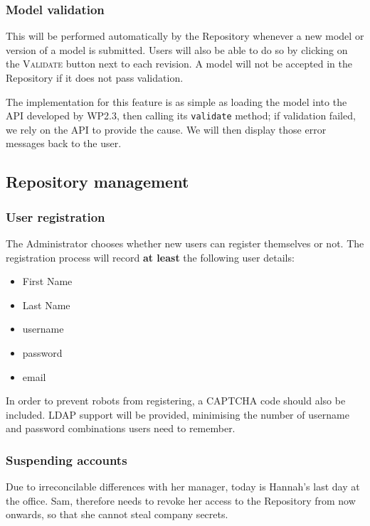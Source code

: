 \subsubsection{Model validation}
This will be performed automatically by the Repository whenever a new model or version of a model is submitted. Users will also be able to do so by clicking on the \textsc{Validate} button next to each revision. A model will not be accepted in the Repository if it does not pass validation. 

\begin{techNote}
The implementation for this feature is as simple as loading the model into the API developed by WP2.3, then calling its \texttt{validate} method; if validation failed, we rely on the API to provide the cause. We will then display those error messages back to the user.
\end{techNote}

\subsection{Repository management} 

\subsubsection{User registration}
The Administrator chooses whether new users can register themselves or not. The registration process will record \textbf{at least} the following user details:
\begin{itemize}
\item First Name
\item Last Name
\item username
\item password
\item email
\end{itemize}


\begin{techNote}
In order to prevent robots from registering, a CAPTCHA code should also be included. LDAP support will be provided, minimising the number of username and password combinations users need to remember. 
\end{techNote}


\subsubsection{Suspending accounts}
Due to irreconcilable differences with her manager, today is Hannah's last day at the office. Sam, therefore needs to revoke her access to the Repository from now onwards, so that she cannot steal company secrets. 

